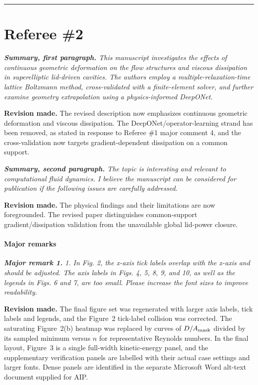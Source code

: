 \documentclass[11pt,a4paper]{article}
\newcommand{\qcomment}[1]{\textcolor{deepblue}{\itshape #1}}
\newcommand{\revwork}[1]{\textbf{\textcolor{revgreen}{#1}}}
\newcommand{\ruleline}{\begin{center}\rule{0.6\textwidth}{0.6pt}\end{center}}
\begin{document}
\bigskip
\ruleline

\section*{Referee \#2}

\medskip
\noindent\qcomment{\textbf{Summary, first paragraph.} This manuscript investigates the effects of continuous geometric deformation on the flow structures and viscous dissipation in superelliptic lid-driven cavities. The authors employ a multiple-relaxation-time lattice Boltzmann method, cross-validated with a finite-element solver, and further examine geometry extrapolation using a physics-informed DeepONet.}

\noindent\revwork{Revision made.} The revised description now emphasizes continuous geometric deformation and viscous dissipation. The DeepONet/operator-learning strand has been removed, as stated in response to Referee \#1 major comment 4, and the cross-validation now targets gradient-dependent dissipation on a common support.

\medskip
\noindent\qcomment{\textbf{Summary, second paragraph.} The topic is interesting and relevant to computational fluid dynamics. I believe the manuscript can be considered for publication if the following issues are carefully addressed.}

\noindent\revwork{Revision made.} The physical findings and their limitations are now foregrounded. The revised paper distinguishes common-support gradient/dissipation validation from the unavailable global lid-power closure.

\medskip
\paragraph{Major remarks}

\medskip
\noindent\qcomment{\textbf{Major remark 1.} 1. In Fig. 2, the x-axis tick labels overlap with the x-axis and should be adjusted. The axis labels in Figs. 4, 5, 8, 9, and 10, as well as the legends in Figs. 6 and 7, are too small. Please increase the font sizes to improve readability.}

\noindent\revwork{Revision made.} The final figure set was regenerated with larger axis labels, tick labels and legends, and the Figure~2 tick-label collision was corrected. The saturating Figure~2(b) heatmap was replaced by curves of $D/A_{\rm mask}$ divided by its sampled minimum versus $n$ for representative Reynolds numbers. In the final layout, Figure~3 is a single full-width kinetic-energy panel, and the supplementary verification panels are labelled with their actual case settings and larger fonts. Dense panels are identified in the separate Microsoft Word alt-text document supplied for AIP.
\end{document}
